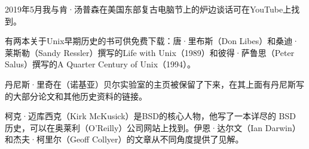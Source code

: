 \documentclass[a4paper,12pt,UTF8,twoside]{ctexbook}
\begin{document}
2019年5月我与肯·汤普森在美国东部复古电脑节上的炉边谈话可在YouTube上找到。

有两本关于Unix早期历史的书可供免费下载：唐·里布斯（Don Libes）和桑迪·莱斯勒（Sandy Ressler）撰写的Life with Unix（1989）和彼得·萨鲁思（Peter Salus）撰写的A Quarter Century of Unix（1994）。

丹尼斯·里奇在（诺基亚）贝尔实验室的主页被保留了下来，在其上面有丹尼斯写的大部分论文和其他历史资料的链接。

柯克·迈库西克（Kirk McKusick）是BSD的核心人物，他写了一本详尽的 BSD 历史，可以在奥莱利（O’Reilly）公司网站上找到。伊恩·达尔文（Ian Darwin）和杰夫·柯里尔（Geoff Collyer）的文章从不同角度提供了见解。







\backmatter
\end{document}
